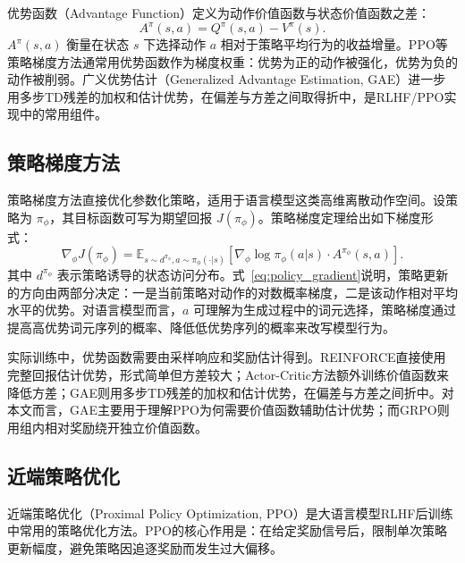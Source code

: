优势函数（Advantage Function）定义为动作价值函数与状态价值函数之差：
\begin{equation}
    A^\pi(s, a) = Q^\pi(s, a) - V^\pi(s).
    \label{eq:advantage}
\end{equation}
$A^\pi(s,a)$ 衡量在状态 $s$ 下选择动作 $a$ 相对于策略平均行为的收益增量。PPO等策略梯度方法通常用优势函数作为梯度权重：优势为正的动作被强化，优势为负的动作被削弱。广义优势估计（Generalized Advantage Estimation, GAE）进一步用多步TD残差的加权和估计优势，在偏差与方差之间取得折中，是RLHF/PPO实现中的常用组件。

\subsection{策略梯度方法}

策略梯度方法直接优化参数化策略，适用于语言模型这类高维离散动作空间。设策略为 $\pi_\phi$，其目标函数可写为期望回报 $J(\pi_\phi)$。策略梯度定理\cite{sutton1999policy}给出如下梯度形式：
\begin{equation}
    \nabla_\phi J(\pi_\phi) = \mathbb{E}_{s \sim d^{\pi_\phi}, a \sim \pi_\phi(\cdot|s)}\left[\nabla_\phi \log \pi_\phi(a|s) \cdot A^{\pi_\phi}(s, a)\right].
    \label{eq:policy_gradient}
\end{equation}
其中 $d^{\pi_\phi}$ 表示策略诱导的状态访问分布。式~\eqref{eq:policy_gradient}说明，策略更新的方向由两部分决定：一是当前策略对动作的对数概率梯度，二是该动作相对平均水平的优势。对语言模型而言，$a$ 可理解为生成过程中的词元选择，策略梯度通过提高高优势词元序列的概率、降低低优势序列的概率来改写模型行为。

实际训练中，优势函数需要由采样响应和奖励估计得到。REINFORCE直接使用完整回报估计优势，形式简单但方差较大；Actor-Critic方法额外训练价值函数来降低方差；GAE则用多步TD残差的加权和估计优势，在偏差与方差之间折中。对本文而言，GAE主要用于理解PPO为何需要价值函数辅助估计优势；而GRPO则用组内相对奖励绕开独立价值函数。

\subsection{近端策略优化}

近端策略优化（Proximal Policy Optimization, PPO）\cite{schulman2017proximal}是大语言模型RLHF后训练中常用的策略优化方法\cite{ouyang2022training}。PPO的核心作用是：在给定奖励信号后，限制单次策略更新幅度，避免策略因追逐奖励而发生过大偏移。

